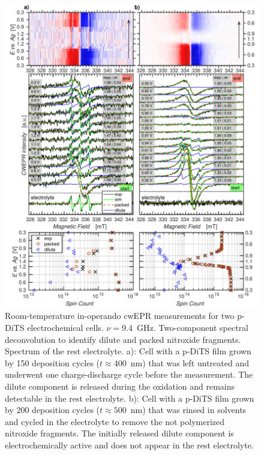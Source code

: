 \newpage
\begin{figure}[H]
\center
	\includegraphics[width=1\textwidth]{./operando_epr/figures/degradation/operando_degradation_dits.pdf}
\caption{Room-temperature in-operando cwEPR measurements for two p-DiTS electrochemical cells. $\nu=$9.4~GHz. Two-component spectral deconvolution to identify dilute and packed nitroxide fragments. Spectrum of the rest electrolyte. a): Cell with a p-DiTS film grown by 150 deposition cycles ($t\approx 400$~nm) that was left untreated and underwent one charge-discharge cycle before the measurement. The dilute component is released during the oxidation and remains detectable in the rest electrolyte. b): Cell with a p-DiTS film grown by 200 deposition cycles ($t\approx 500$~nm) that was rinsed in solvents and cycled in the electrolyte to remove the not polymerized nitroxide fragments. The initially released dilute component is electrochemically active and does not appear in the rest electrolyte.}
\label{fig:S6}
\end{figure}


